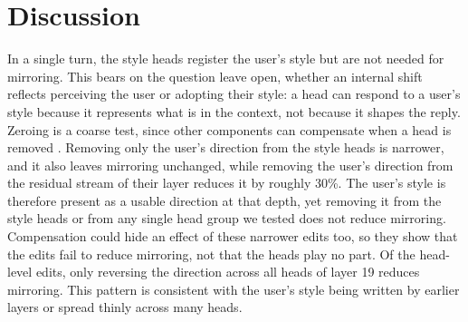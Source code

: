 \section{Discussion}
\label{sec:discussion}

In a single turn, the style heads register the user's style but are not needed for mirroring. This bears on the question \citet{sprejer2026white} leave open, whether an internal shift reflects perceiving the user or adopting their style: a head can respond to a user's style because it represents what is in the context, not because it shapes the reply. Zeroing is a coarse test, since other components can compensate when a head is removed \citep{mcgrath2023hydra}. Removing only the user's direction from the style heads is narrower, and it also leaves mirroring unchanged, while removing the user's direction from the residual stream of their layer reduces it by roughly 30\%. The user's style is therefore present as a usable direction at that depth, yet removing it from the style heads or from any single head group we tested does not reduce mirroring. Compensation could hide an effect of these narrower edits too, so they show that the edits fail to reduce mirroring, not that the heads play no part. Of the head-level edits, only reversing the direction across all heads of layer 19 reduces mirroring. This pattern is consistent with the user's style being written by earlier layers or spread thinly across many heads.

